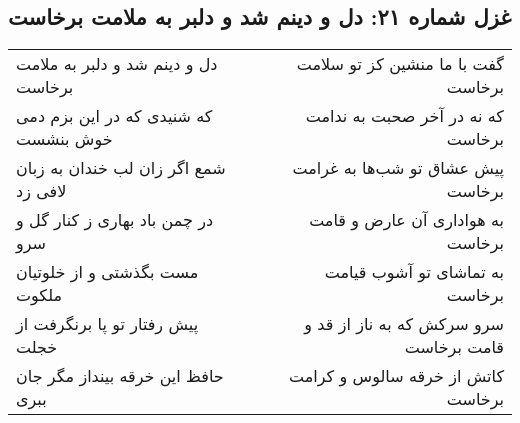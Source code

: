\begin{center}
\section*{غزل شماره ۲۱: دل و دینم شد و دلبر به ملامت برخاست}
\label{sec:sh021}
\begin{longtable}{l p{0.5cm} r}
دل و دینم شد و دلبر به ملامت برخاست
&&
گفت با ما منشین کز تو سلامت برخاست
\\
که شنیدی که در این بزم دمی خوش بنشست
&&
که نه در آخر صحبت به ندامت برخاست
\\
شمع اگر زان لب خندان به زبان لافی زد
&&
پیش عشاق تو شب‌ها به غرامت برخاست
\\
در چمن باد بهاری ز کنار گل و سرو
&&
به هواداری آن عارض و قامت برخاست
\\
مست بگذشتی و از خلوتیان ملکوت
&&
به تماشای تو آشوب قیامت برخاست
\\
پیش رفتار تو پا برنگرفت از خجلت
&&
سرو سرکش که به ناز از قد و قامت برخاست
\\
حافظ این خرقه بینداز مگر جان ببری
&&
کاتش از خرقه سالوس و کرامت برخاست
\\
\end{longtable}
\end{center}
